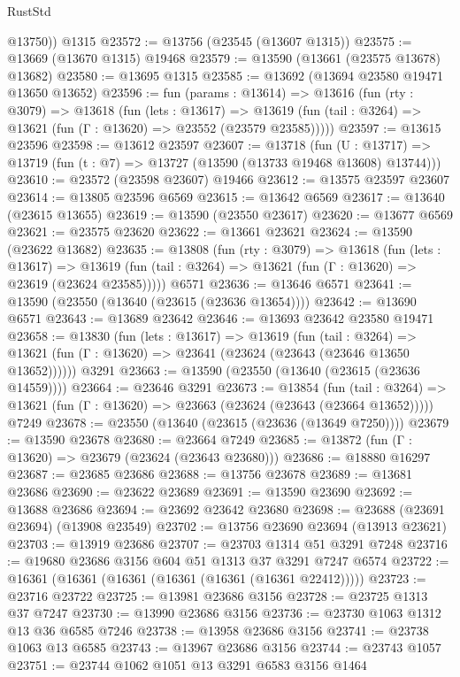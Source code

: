 \begin{lexlean}{RustStd}
\begin{coremodule}
        @13750))
    @1315
@23572 := @13756 (@23545 (@13607 @1315))
@23575 := @13669 (@13670 @1315) @19468
@23579 := @13590 (@13661 (@23575 @13678) @13682)
@23580 := @13695 @1315
@23585 := @13692 (@13694 @23580 @19471 @13650 @13652)
@23596 := fun (params : @13614) =>
  @13616
    (fun (rty : @3079) =>
    @13618
      (fun (lets : @13617) =>
      @13619 (fun (tail : @3264) => @13621 (fun (Γ : @13620) => @23552 (@23579 @23585)))))
@23597 := @13615 @23596
@23598 := @13612 @23597
@23607 := @13718
    (fun (U : @13717) => @13719 (fun (t : @7) => @13727 (@13590 (@13733 @19468 @13608) @13744)))
@23610 := @23572 (@23598 @23607) @19466
@23612 := @13575 @23597 @23607
@23614 := @13805 @23596 @6569
@23615 := @13642 @6569
@23617 := @13640 (@23615 @13655)
@23619 := @13590 (@23550 @23617)
@23620 := @13677 @6569
@23621 := @23575 @23620
@23622 := @13661 @23621
@23624 := @13590 (@23622 @13682)
@23635 := @13808
    (fun (rty : @3079) =>
    @13618
      (fun (lets : @13617) =>
      @13619 (fun (tail : @3264) => @13621 (fun (Γ : @13620) => @23619 (@23624 @23585)))))
    @6571
@23636 := @13646 @6571
@23641 := @13590 (@23550 (@13640 (@23615 (@23636 @13654))))
@23642 := @13690 @6571
@23643 := @13689 @23642
@23646 := @13693 @23642 @23580 @19471
@23658 := @13830
    (fun (lets : @13617) =>
    @13619
      (fun (tail : @3264) =>
      @13621 (fun (Γ : @13620) => @23641 (@23624 (@23643 (@23646 @13650 @13652))))))
    @3291
@23663 := @13590 (@23550 (@13640 (@23615 (@23636 @14559))))
@23664 := @23646 @3291
@23673 := @13854
    (fun (tail : @3264) => @13621 (fun (Γ : @13620) => @23663 (@23624 (@23643 (@23664 @13652)))))
    @7249
@23678 := @23550 (@13640 (@23615 (@23636 (@13649 @7250))))
@23679 := @13590 @23678
@23680 := @23664 @7249
@23685 := @13872 (fun (Γ : @13620) => @23679 (@23624 (@23643 @23680)))
@23686 := @18880 @16297
@23687 := @23685 @23686
@23688 := @13756 @23678
@23689 := @13681 @23686
@23690 := @23622 @23689
@23691 := @13590 @23690
@23692 := @13688 @23686
@23694 := @23692 @23642 @23680
@23698 := @23688 (@23691 @23694) (@13908 @23549)
@23702 := @13756 @23690 @23694 (@13913 @23621)
@23703 := @13919 @23686
@23707 := @23703 @1314 @51 @3291 @7248
@23716 := @19680 @23686 @3156 @604 @51 @1313 @37 @3291 @7247 @6574
@23722 := @16361 (@16361 (@16361 (@16361 (@16361 (@16361 @22412)))))
@23723 := @23716 @23722
@23725 := @13981 @23686 @3156
@23728 := @23725 @1313 @37 @7247
@23730 := @13990 @23686 @3156
@23736 := @23730 @1063 @1312 @13 @36 @6585 @7246
@23738 := @13958 @23686 @3156
@23741 := @23738 @1063 @13 @6585
@23743 := @13967 @23686 @3156
@23744 := @23743 @1057
@23751 := @23744 @1062 @1051 @13 @3291 @6583 @3156 @1464

\end{coremodule}
\end{lexlean}
